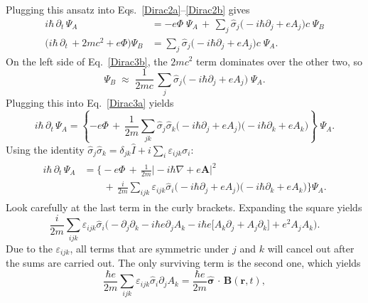 \documentclass[pra,12pt]{revtex4}
\begin{document}
Plugging this ansatz into Eqs.~\eqref{Dirac2a}--\eqref{Dirac2b} gives
\begin{align}
  i\hbar\, \partial_t \, \Psi_A
  &= -e\Phi\; \Psi_A
  \,+\, \sum_{j} \hat{\sigma}_j \big(-i\hbar\partial_j
    +eA_j \big) c\;\Psi_B \label{Dirac3a} \\
  \big(i\hbar\, \partial_t \, + 2mc^2 + e\Phi\big)
  \Psi_B
  &= \sum_{j} \hat{\sigma}_j \big(-i\hbar\partial_j
    +eA_j \big) c\;\Psi_A. \label{Dirac3b}
\end{align}
On the left side of Eq.~\eqref{Dirac3b}, the $2mc^2$ term dominates
over the other two, so
\begin{equation}
  \Psi_B \;\approx\; \frac{1}{2mc}\, \sum_{j}
  \hat{\sigma}_j \big(-i\hbar\partial_j +eA_j \big) \;\Psi_A.
\end{equation}
Plugging this into Eq.~\eqref{Dirac3a} yields
\begin{equation}
  i\hbar\, \partial_t \, \Psi_A
  = \left\{-e\Phi \,+\, \frac{1}{2m} \sum_{jk} \hat{\sigma}_j \hat{\sigma}_k
  \big(-i\hbar\partial_j +eA_j \big)
  \big(-i\hbar\partial_k +eA_k \big) \right\}\;\Psi_A.
\end{equation}
Using the identity $\hat{\sigma}_j\hat{\sigma}_k = \delta_{jk}\hat{I}
+ i \sum_i \varepsilon_{ijk}\sigma_i$:
\begin{align}
  \begin{aligned}
  i\hbar\, \partial_t \, \Psi_A
  &= \Bigg\{-e\Phi
  \,+\, \frac{1}{2m} \big|-i\hbar\nabla +e\mathbf{A} \big|^2 \\
  &\qquad+\, \frac{i}{2m} \sum_{ijk} \varepsilon_{ijk} \hat{\sigma}_i
  \big(-i\hbar\partial_j +eA_j \big)
  \big(-i\hbar\partial_k +eA_k \big)
  \Bigg\} \Psi_A.
  \end{aligned}
\end{align}
Look carefully at the last term in the curly brackets.  Expanding the
square yields
\begin{equation*}
  \frac{i}{2m}\sum_{ijk}\varepsilon_{ijk}\hat{\sigma}_i
  \Big(-\partial_j\partial_k -i\hbar e \partial_jA_k
  - i\hbar e \big[A_k\partial_j + A_j\partial_k \big]
  + e^2A_jA_k \Big).
\end{equation*}
Due to the $\varepsilon_{ijk}$, all terms that are symmetric under $j$
and $k$ will cancel out after the sums are carried out.  The only
surviving term is the second one, which yields
\begin{equation}
  \frac{\hbar e}{2m}\sum_{ijk}\varepsilon_{ijk}\hat{\sigma}_i
  \partial_jA_k = \frac{\hbar e}{2m} \hat{\boldsymbol{\sigma}}
  \,\cdot\, \mathbf{B}(\mathbf{r},t),
\end{equation}
\end{document}
